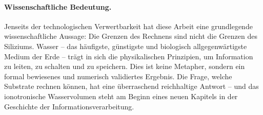 ﻿\documentclass[a4paper,12pt]{scrreprt}
\theoremstyle{definition}
\begin{document}
\paragraph{Wissenschaftliche Bedeutung.}
Jenseits der technologischen Verwertbarkeit hat diese Arbeit eine
grundlegende wissenschaftliche Aussage: Die Grenzen des Rechnens
sind nicht die Grenzen des Siliziums. Wasser -- das häufigste,
günstigste und biologisch allgegenwärtigste Medium der Erde --
trägt in sich die physikalischen Prinzipien, um Information zu
leiten, zu schalten und zu speichern. Dies ist keine Metapher,
sondern ein formal bewiesenes und numerisch validiertes Ergebnis.
Die Frage, welche Substrate rechnen können, hat eine überraschend
reichhaltige Antwort -- und das ionotronische Wasservolumen steht
am Beginn eines neuen Kapitels in der Geschichte der Informationsverarbeitung.
\end{document}
